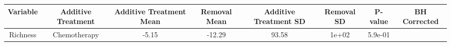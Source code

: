 \documentclass[12pt,]{article}
\begin{document}
\begin{longtable}[]{@{}cccccccc@{}}
\toprule
\begin{minipage}[b]{0.12\columnwidth}\centering\strut
Variable\strut
\end{minipage} & \begin{minipage}[b]{0.11\columnwidth}\centering\strut
Additive Treatment\strut
\end{minipage} & \begin{minipage}[b]{0.13\columnwidth}\centering\strut
Additive Treatment Mean\strut
\end{minipage} & \begin{minipage}[b]{0.08\columnwidth}\centering\strut
Removal Mean\strut
\end{minipage} & \begin{minipage}[b]{0.13\columnwidth}\centering\strut
Additive Treatment SD\strut
\end{minipage} & \begin{minipage}[b]{0.07\columnwidth}\centering\strut
Removal SD\strut
\end{minipage} & \begin{minipage}[b]{0.06\columnwidth}\centering\strut
P-value\strut
\end{minipage} & \begin{minipage}[b]{0.08\columnwidth}\centering\strut
BH Corrected\strut
\end{minipage}\tabularnewline
\midrule
\endhead
\begin{minipage}[t]{0.12\columnwidth}\centering\strut
Richness\strut
\end{minipage} & \begin{minipage}[t]{0.11\columnwidth}\centering\strut
Chemotherapy\strut
\end{minipage} & \begin{minipage}[t]{0.13\columnwidth}\centering\strut
-5.15\strut
\end{minipage} & \begin{minipage}[t]{0.08\columnwidth}\centering\strut
-12.29\strut
\end{minipage} & \begin{minipage}[t]{0.13\columnwidth}\centering\strut
93.58\strut
\end{minipage} & \begin{minipage}[t]{0.07\columnwidth}\centering\strut
1e+02\strut
\end{minipage} & \begin{minipage}[t]{0.06\columnwidth}\centering\strut
5.9e-01\strut
\end{minipage} & \begin{minipage}[t]{0.08\columnwidth}\centering\strut

\end{minipage}
\end{longtable}
\end{document}
